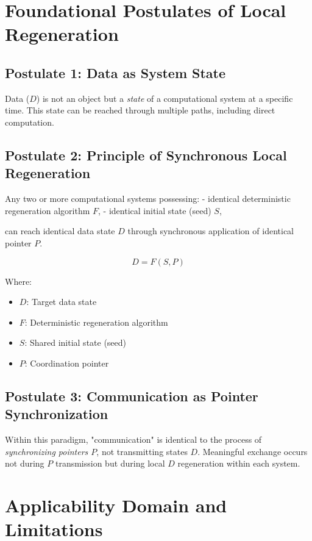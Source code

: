 \documentclass[11pt,a4paper]{article}
\begin{document}
\section{Foundational Postulates of Local Regeneration}

\subsection{Postulate 1: Data as System State}

Data ($D$) is not an object but a \emph{state} of a computational system at a specific time. This state can be reached through multiple paths, including direct computation.

\subsection{Postulate 2: Principle of Synchronous Local Regeneration}

Any two or more computational systems possessing:
- identical deterministic regeneration algorithm $F$,
- identical initial state (seed) $S$,

can reach identical data state $D$ through synchronous application of identical pointer $P$.

\begin{equation}
D = F(S, P)
\end{equation}

Where:
\begin{itemize}
    \item $D$: Target data state
    \item $F$: Deterministic regeneration algorithm
    \item $S$: Shared initial state (seed)
    \item $P$: Coordination pointer
\end{itemize}

\subsection{Postulate 3: Communication as Pointer Synchronization}

Within this paradigm, "communication" is identical to the process of \emph{synchronizing pointers $P$}, not transmitting states $D$. Meaningful exchange occurs not during $P$ transmission but during local $D$ regeneration within each system.

\section{Applicability Domain and Limitations}
\end{document}
